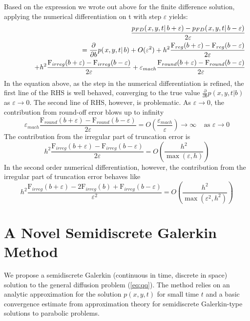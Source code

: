 \documentclass[10pt]{article}
\begin{document}
Based on the expression we wrote out above for the finite difference solution, 
applying the numerical differentiation on t with step $\varepsilon$ yields: 
\begin{eqnarray}
& & \frac{p_{FD}(\left. x, y, t \right| b+\varepsilon)-p_{FD}(\left. x, y, t \right| b -\varepsilon)}{2 \varepsilon} \nonumber \\
& & \hspace*{1cm} =  \frac{\partial }{\partial b} p(\left. x, y, t \right| b) + O(\varepsilon^2)
 + h^2 \frac{\mbox{F}_{reg}(b+\varepsilon)-\mbox{F}_{reg}(b-\varepsilon)}{2 \varepsilon}  \nonumber \\
& & \hspace*{1cm} + h^2 \frac{\mbox{F}_{irreg}(b+\varepsilon)-\mbox{F}_{irreg}(b-\varepsilon)}{2 \varepsilon}
 + \varepsilon_{mach} \frac{\mbox{F}_{round}(b+\varepsilon)-\mbox{F}_{round}(b-\varepsilon)}{2 \varepsilon}  \nonumber
\end{eqnarray}
In the equation above, as the step in the numerical differentiation is refined, the first line 
of the RHS is well behaved, converging to the true value 
$\frac{\partial }{\partial b} p(\left. x, y, t \right| b)$ as $\varepsilon \rightarrow 0$. 
The second line of RHS, however, is problematic. As $\varepsilon \rightarrow 0$, 
the contribution from round-off error blows up to infinity
$$ \varepsilon_{mach} \frac{\mbox{F}_{round}(b+\varepsilon)-\mbox{F}_{round}(b-\varepsilon)}{2 \varepsilon}  = O\left(\frac{\varepsilon_{mach}}{\varepsilon} \right) 
\longrightarrow \infty \;\;\;\; \mbox{as } \varepsilon \rightarrow 0 $$
The contribution from the irregular part of truncation error is 
$$ h^2 \frac{\mbox{F}_{irreg}(b+\varepsilon)-\mbox{F}_{irreg}(b-\varepsilon)}{2 \varepsilon}  = 
O\left(\frac{h^2}{\max(\varepsilon, h)} \right) $$ 
In the second order numerical differentiation, however, the contribution from 
the irregular part of truncation error behaves like 
$$ h^2 \frac{\mbox{F}_{irreg}(b+\varepsilon)-2\mbox{F}_{irreg}(b)
+\mbox{F}_{irreg}(b-\varepsilon)}{\varepsilon^2 }  = 
O\left(\frac{h^2}{\max(\varepsilon^2, h^2)} \right) $$

\section{A Novel Semidiscrete Galerkin
  Method} \label{sec:semidiscrete-galerkin} We propose a semidiscrete
Galerkin (continuous in time, discrete in space) solution to the
general diffusion problem (\ref{eq:qq}). The method relies on an
analytic approximation for the solution $p(x,y,t)$ for small time $t$
and a basic convergence estimate from approximation theory for
semidiscrete Galerkin-type solutions to parabolic problems.
\end{document}
